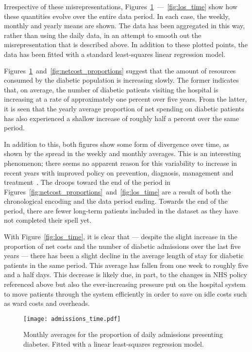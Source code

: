 Irrespective of these misrepresentations,
Figures~\ref{fig:admissions}~---~\ref{fig:los_time} show how these quantities
evolve over the entire data period. In each case, the weekly, monthly and yearly
means are shown. The data has been aggregated in this way, rather than using the
daily data, in an attempt to smooth out the misrepresentation that is described
above. In addition to these plotted points, the data has been fitted with a
standard least-squares linear regression model.

Figures~\ref{fig:admissions}~and~\ref{fig:netcost_proportions} suggest that the
amount of resources consumed by the diabetic population is increasing slowly.
The former indicates that, on average, the number of diabetic patients
visiting the hospital is increasing at a rate of approximately one percent over
five years. From the latter, it is seen that the yearly average proportion of
net spending on diabetic patients has also experienced a shallow increase of
roughly half a percent over the same period.

In addition to this, both figures show some form of divergence over time, as
shown by the spread in the weekly and monthly averages. This is an interesting
phenomenon; there seems no apparent reason for this variability to increase in
recent years with improved policy on prevention, diagnosis, management and
treatment~\cite{NHS:ltp,NICE,Penn2018,PHE}. The droops toward the end of the
period in Figures~\ref{fig:netcost_proportions}~and~\ref{fig:los_time} are a
result of both the chronological encoding and the data period ending. Towards
the end of the period, there are fewer long-term patients included in the
dataset as they have not completed their spell yet.

With Figure~\ref{fig:los_time}, it is clear that --- despite the slight
increase in the proportion of net costs and the number of diabetic admissions
over the last five years --- there has been a slight decline in the average
length of stay for diabetic patients in the same period. This average has fallen
from one week to roughly five and a half days. This decrease is likely due, in
part, to the changes in NHS policy referenced above but also the ever-increasing
pressure put on the hospital system to move patients through the system
efficiently in order to save on idle costs such as ward costs and overheads.

\begin{figure}
    \centering
    \texttt{[image: admissions\_time.pdf]}
    \caption{Monthly averages for the proportion of daily admissions presenting
        diabetes. Fitted with a linear least-squares regression model.}%
    \label{fig:admissions}
\end{figure}


